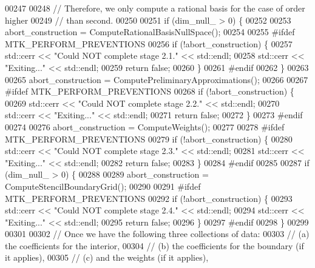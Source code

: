 \begin{DoxyCode}
{{00247 
00248   \textcolor{comment}{// Therefore, we only compute a rational basis for the case of order higher}
00249   \textcolor{comment}{// than second.}
00250 
00251   \textcolor{keywordflow}{if} (dim\_null\_ > 0) \{
00252 
00253     abort\_construction = ComputeRationalBasisNullSpace();
00254 
00255 \textcolor{preprocessor}{    #ifdef MTK\_PERFORM\_PREVENTIONS}
00256     \textcolor{keywordflow}{if} (!abort\_construction) \{
00257       std::cerr << \textcolor{stringliteral}{"Could NOT complete stage 2.1."} << std::endl;
00258       std::cerr << \textcolor{stringliteral}{"Exiting..."} << std::endl;
00259       \textcolor{keywordflow}{return} \textcolor{keyword}{false};
00260     \}
00261 \textcolor{preprocessor}{    #endif}
00262   \}
00263 
00265   abort\_construction = ComputePreliminaryApproximations();
00266 
00267 \textcolor{preprocessor}{  #ifdef MTK\_PERFORM\_PREVENTIONS}
00268   \textcolor{keywordflow}{if} (!abort\_construction) \{
00269     std::cerr << \textcolor{stringliteral}{"Could NOT complete stage 2.2."} << std::endl;
00270     std::cerr << \textcolor{stringliteral}{"Exiting..."} << std::endl;
00271     \textcolor{keywordflow}{return} \textcolor{keyword}{false};
00272   \}
00273 \textcolor{preprocessor}{  #endif}
00274 
00276   abort\_construction = ComputeWeights();
00277 
00278 \textcolor{preprocessor}{  #ifdef MTK\_PERFORM\_PREVENTIONS}
00279   \textcolor{keywordflow}{if} (!abort\_construction) \{
00280     std::cerr << \textcolor{stringliteral}{"Could NOT complete stage 2.3."} << std::endl;
00281     std::cerr << \textcolor{stringliteral}{"Exiting..."} << std::endl;
00282     \textcolor{keywordflow}{return} \textcolor{keyword}{false};
00283   \}
00284 \textcolor{preprocessor}{  #endif}
00285 
00287   \textcolor{keywordflow}{if} (dim\_null\_ > 0) \{
00288 
00289     abort\_construction = ComputeStencilBoundaryGrid();
00290 
00291 \textcolor{preprocessor}{    #ifdef MTK\_PERFORM\_PREVENTIONS}
00292     \textcolor{keywordflow}{if} (!abort\_construction) \{
00293       std::cerr << \textcolor{stringliteral}{"Could NOT complete stage 2.4."} << std::endl;
00294       std::cerr << \textcolor{stringliteral}{"Exiting..."} << std::endl;
00295       \textcolor{keywordflow}{return} \textcolor{keyword}{false};
00296     \}
00297 \textcolor{preprocessor}{    #endif}
00298   \}
00299 
00301 
00302   \textcolor{comment}{// Once we have the following three collections of data:}
00303   \textcolor{comment}{//   (a) the coefficients for the interior,}
00304   \textcolor{comment}{//   (b) the coefficients for the boundary (if it applies),}
00305   \textcolor{comment}{//   (c) and the weights (if it applies),}
}}
\end{DoxyCode}
